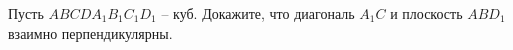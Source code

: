 Пусть $ABCDA_1B_1C_1D_1$ -- куб. Докажите, что диагональ $A_1C$ и плоскость $ABD_1$ взаимно перпендикулярны.
